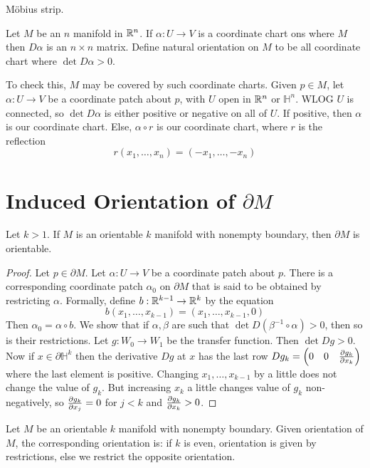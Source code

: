 \documentclass[12pt]{article}
\begin{document}
\begin{ex}
    M\"obius strip.
\end{ex}

\begin{defn}
    Let $M$ be an $n$ manifold in $\mathbb{R}^n$. If $\alpha: U \rightarrow V$ is a coordinate chart ons where $M$ then $D\alpha$ is an $n \times n$ matrix. Define natural orientation on $M$ to be all coordinate chart where $\det D\alpha > 0$.
\end{defn}

To check this, $M$ may be covered by such coordinate charts. Given $p \in M$, let $\alpha: U \rightarrow V$ be a coordinate patch about $p$, with $U$ open in $\mathbb{R}^n$ or $\mathbb H^n$. WLOG $U$ is connected, so $\det D\alpha$ is either positive or negative on all of $U$. If positive, then $\alpha$ is our coordinate chart. Else, $\alpha\circ r$ is our coordinate chart, where $r$ is the reflection
$$r(x_1,\dots,x_n) = (-x_1,\dots,-x_n)$$

\section{Induced Orientation of $\partial M$}

\begin{thm}
    Let $k > 1$. If $M$ is an orientable $k$ manifold with nonempty boundary, then $\partial M$ is orientable.
\end{thm}

\begin{proof}
    Let $p \in \partial M$. Let $\alpha: U \rightarrow V$ be a coordinate patch about $p$. There is a corresponding coordinate patch $\alpha_0$ on $\partial M$ that is said to be obtained by restricting $\alpha$. Formally, define $b: \mathbb{R}^{k-1} \rightarrow \mathbb{R}^k$ by the equation
    $$b(x_1,\dots,x_{k-1}) = (x_1,\dots,x_{k-1},0)$$
    Then $\alpha_0 = \alpha \circ b$. We show that if $\alpha,\beta$ are such that $\det D(\beta^{-1}\circ\alpha) > 0$, then so is their restrictions. Let $g: W_0 \rightarrow W_1$ be the transfer function. Then $\det Dg > 0$. Now if $x \in \partial \mathbb H^k$ then the derivative $Dg$ at $x$ has the last row $Dg_k = \begin{pmatrix} 0 & 0 & \frac{\partial g_k}{\partial x_k}\end{pmatrix}$ where the last element is positive. Changing $x_1,\dots,x_{k-1}$ by a little does not change the value of $g_k$. But increasing $x_k$ a little changes value of $g_k$ non-negatively, so $\frac{\partial g_k}{\partial x_j} = 0$ for $j < k$ and $\frac{\partial g_k}{\partial x_k} > 0$.
\end{proof}

\begin{defn}
    Let $M$ be an orientable $k$ manifold with nonempty boundary. Given orientation of $M$, the corresponding orientation is: if $k$ is even, orientation is given by restrictions, else we restrict the opposite orientation.
\end{defn}
\end{document}
